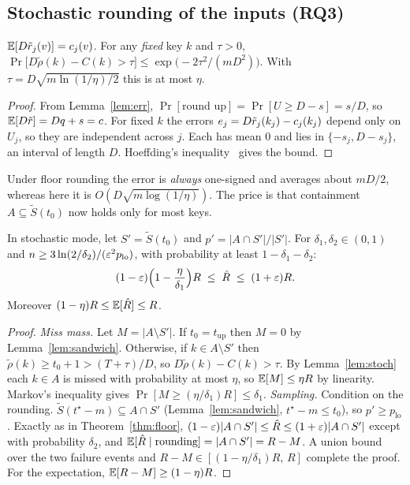 \subsection{Stochastic rounding of the inputs (RQ3)}
\begin{lemma}\label{lem:stoch}
$\mathbb{E}[D\tilde r_j(v)]=c_j(v)$. For any \emph{fixed} key $k$ and $\tau>0$,
$\Pr\big[D\tilde\rho(k)-C(k)>\tau\big]\le\exp\!\big(-2\tau^2/(mD^2)\big)$.
With $\tau=D\sqrt{m\ln(1/\eta)/2}$ this is at most $\eta$.
\end{lemma}
\begin{proof}
From Lemma~\ref{lem:err}, $\Pr[\text{round up}]=\Pr[U\ge D-s]=s/D$, so $\mathbb{E}[D\tilde r]=Dq+s=c$. For fixed $k$ the errors
$e_j=D\tilde r_j(k_j)-c_j(k_j)$ depend only on $U_j$, so they are independent across $j$. Each has mean $0$ and lies in $\{-s_j,D-s_j\}$,
an interval of length $D$. Hoeffding's inequality~\cite{hoeffding1963} gives the bound.
\end{proof}
Under floor rounding the error is \emph{always} one-signed and averages about $mD/2$, whereas here
it is $O(D\sqrt{m\log(1/\eta)})$. The price is that containment $A\subseteq\tilde S(t_0)$ now holds only
for most keys.

\begin{theorem}\label{thm:stoch}
In stochastic mode, let $S'=\tilde S(t_0)$ and $p'=|A\cap S'|/|S'|$. For $\delta_1,\delta_2\in(0,1)$ and
$n\ge3\ln(2/\delta_2)/(\varepsilon^2p_{\mathrm{lo}})$, with probability at least $1-\delta_1-\delta_2$:
\[ (1-\varepsilon)\Big(1-\frac{\eta}{\delta_1}\Big)R\;\le\;\hat R\;\le\;(1+\varepsilon)R. \]
Moreover $(1-\eta)R\le\mathbb{E}[\hat R]\le R$.
\end{theorem}
\begin{proof}
\emph{Miss mass.} Let $M=|A\setminus S'|$. If $t_0=t_{\mathrm{up}}$ then $M=0$ by Lemma~\ref{lem:sandwich}.
Otherwise, if $k\in A\setminus S'$ then $\tilde\rho(k)\ge t_0+1>(T+\tau)/D$, so $D\tilde\rho(k)-C(k)>\tau$.
By Lemma~\ref{lem:stoch} each $k\in A$ is missed with probability at most $\eta$, so $\mathbb{E}[M]\le\eta R$ by linearity.
Markov's inequality gives $\Pr[M\ge(\eta/\delta_1)R]\le\delta_1$.
\emph{Sampling.} Condition on the rounding. $\tilde S(t^\star-m)\subseteq A\cap S'$ (Lemma~\ref{lem:sandwich}, $t^\star-m\le t_0$),
so $p'\ge p_{\mathrm{lo}}$. Exactly as in Theorem~\ref{thm:floor}, $(1-\varepsilon)|A\cap S'|\le\hat R\le(1+\varepsilon)|A\cap S'|$ except with probability $\delta_2$,
and $\mathbb{E}[\hat R\mid\text{rounding}]=|A\cap S'|=R-M$. A union bound over the two failure events and
$R-M\in[(1-\eta/\delta_1)R,\,R]$ complete the proof. For the expectation, $\mathbb{E}[R-M]\ge(1-\eta)R$.
\end{proof}

